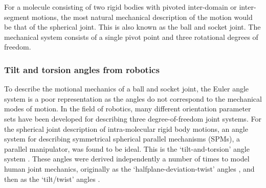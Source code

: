 For a molecule consisting of two rigid bodies with pivoted inter-domain or inter-segment motions, the most natural mechanical description of the motion would be that of the spherical joint.
This is also known as the ball and socket joint.
The mechanical system consists of a single pivot point and three rotational degrees of freedom.




\subsubsection{Tilt and torsion angles from robotics}

To describe the motional mechanics of a ball and socket joint, the Euler angle system is a poor representation as the angles do not correspond to the mechanical modes of motion.
In the field of robotics, many different orientation parameter sets have been developed for describing three degree-of-freedom joint systems.
For the spherical joint description of intra-molecular rigid body motions, an angle system for describing symmetrical spherical parallel mechanisms (SPMs), a parallel manipulator, was found to be ideal.
This is the `tilt-and-torsion' angle system \citep{Huang99,BonevGosselin06}.
These angles were derived independently a number of times to model human joint mechanics, originally as the `halfplane-deviation-twist' angles \citep{Korein85}, and then as the `tilt/twist' angles \citep{Crawford99}.

